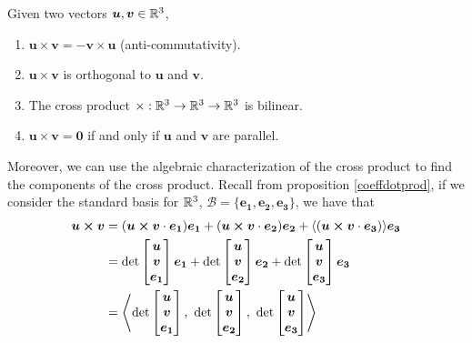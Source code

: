 \begin{theorem}
    
    Given two vectors $\bm{u}, \bm{v} \in \mathbb{R}^3$,
    
    \begin{enumerate}
        \item $\bm{u} \times \bm{v} = - \bm{v} \times \bm{u}$ (anti-commutativity).
        \item $\bm{u} \times \bm{v}$ is orthogonal to $\bm{u}$ and $\bm{v}$.
        \item The cross product $\times : \mathbb{R}^3 \to \mathbb{R}^3 \to \mathbb{R}^3$ is bilinear.
        \item $\bm{u} \times \bm{v} = \bm{0}$ if and only if $\bm{u}$ and $\bm{v}$ are parallel.
    \end{enumerate}
    
    \end{theorem}

Moreover, we can use the algebraic characterization of the cross product to find the components of the cross product.  Recall from proposition \ref{coeffdotprod}, if we consider the standard basis for $\mathbb{R}^3$, $\mathscr{B} = \{ \bm{e_1}, \bm{e_2},\bm{e_3}\}$, we have that 
\begin{align*}
        \bm{u \times v} &=  (\bm{u \times v}\cdot \bm{e_1}) \bm{e_1} + (\bm{u \times v}\cdot \bm{e_2}) \bm{e_2} + \langle(\bm{u \times v}\cdot \bm{e_3}) \rangle \bm{e_3} \\
        &= \textnormal{det}
\begin{bmatrix}
\bm{u}\\
    \bm{v}  \\
    \bm{e_1}
\end{bmatrix}\bm{e_1} + \textnormal{det}
\begin{bmatrix}
\bm{u}\\
    \bm{v}  \\
    \bm{e_2}
\end{bmatrix}\bm{e_2} + \textnormal{det}
\begin{bmatrix}
\bm{u}\\
    \bm{v}  \\
    \bm{e_3}
\end{bmatrix}\bm{e_3} \\
    &= 
    \left\langle\textnormal{det}
\begin{bmatrix}
\bm{u}\\
    \bm{v}  \\
    \bm{e_1}
\end{bmatrix}, \  \textnormal{det}
\begin{bmatrix}
\bm{u}\\
    \bm{v}  \\
    \bm{e_2}
\end{bmatrix}, \ \textnormal{det}
\begin{bmatrix}
\bm{u}\\
    \bm{v}  \\
    \bm{e_3}
\end{bmatrix} \right\rangle
    \end{align*}

